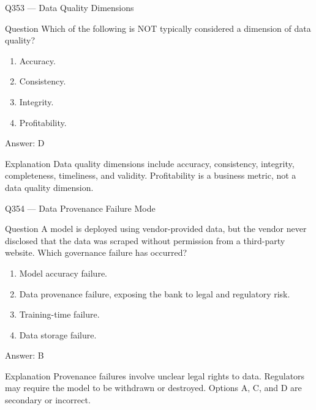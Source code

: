 \documentclass[aspectratio=169,8pt]{beamer}
\begin{document}
	\begin{frame}{Q353 --- Data Quality Dimensions}
		\begin{block}{Question}
			Which of the following is NOT typically considered a dimension of data quality?
			\begin{enumerate}
				\item Accuracy.
				\item Consistency.
				\item Integrity.
				\item Profitability.
			\end{enumerate}
		\end{block}
		\begin{exampleblock}{Answer: D}\end{exampleblock}
		\begin{block}{Explanation}
			Data quality dimensions include accuracy, consistency, integrity, completeness, timeliness, and validity. Profitability is a business metric, not a data quality dimension.
		\end{block}
	\end{frame}
	
	\begin{frame}{Q354 --- Data Provenance Failure Mode}
		\begin{block}{Question}
			A model is deployed using vendor-provided data, but the vendor never disclosed that the data was scraped without permission from a third-party website. Which governance failure has occurred?
			\begin{enumerate}
				\item Model accuracy failure.
				\item Data provenance failure, exposing the bank to legal and regulatory risk.
				\item Training-time failure.
				\item Data storage failure.
			\end{enumerate}
		\end{block}
		\begin{exampleblock}{Answer: B}\end{exampleblock}
		\begin{block}{Explanation}
			Provenance failures involve unclear legal rights to data. Regulators may require the model to be withdrawn or destroyed. Options A, C, and D are secondary or incorrect.
		\end{block}
	\end{frame}
	
\end{document}
